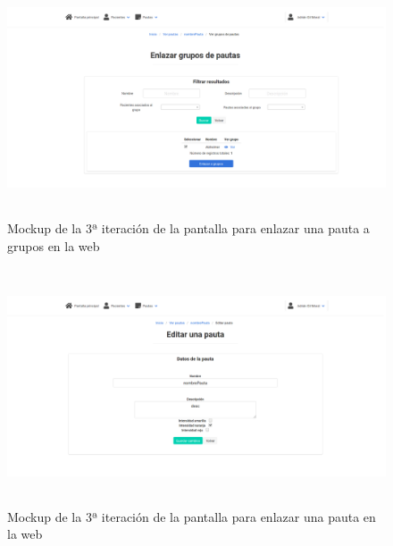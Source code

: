 \begin{figure}[H]
    \centering
    \includegraphics[height=7cm, width=\textwidth]{Imagenes/04DescProblema/mockups/v3/web/11-verPauta-enlazarGrupo.png}
    \caption[Mockup de la 3ª iteración de la pantalla para enlazar una pauta a grupos en la web]{Mockup de la 3ª iteración de la pantalla para enlazar una pauta a grupos en la web}
    \label{c4:fig:v3:web:enlazarPautaGrupos}
\end{figure}

\begin{figure}[H]
    \centering
    \includegraphics[height=7cm, width=\textwidth]{Imagenes/04DescProblema/mockups/v3/web/11-verPauta-editar.png}
    \caption[Mockup de la 3ª iteración de la pantalla para editar una pauta en la web]{Mockup de la 3ª iteración de la pantalla para enlazar una pauta en la web}
    \label{c4:fig:v3:web:editarPauta}
\end{figure}

